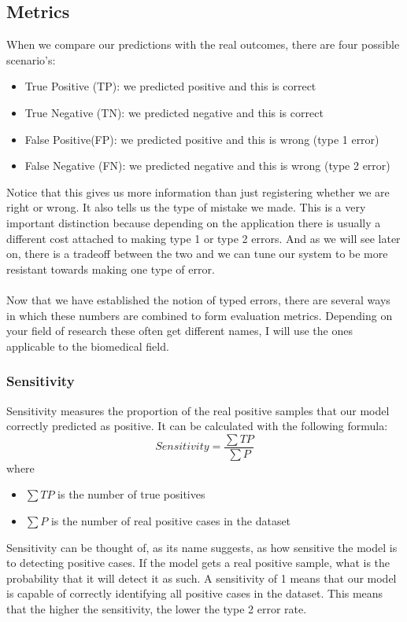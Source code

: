 \subsection{Metrics}
When we compare our predictions with the real outcomes, there are four possible scenario's:
\begin{itemize}
	\item True Positive (TP): we predicted positive and this is correct
	\item True Negative (TN): we predicted negative and this is correct
	\item False Positive(FP): we predicted positive and this is wrong (type 1 error)
	\item False Negative (FN): we predicted negative and this is wrong (type 2 error)
\end{itemize}
Notice that this gives us more information than just registering whether we are right or wrong. It also tells us the type of mistake we made. This is a very important distinction because depending on the application there is usually a different cost attached to making type 1 or type 2 errors. And as we will see later on, there is a tradeoff between the two and we can tune our system to be more resistant towards making one type of error. \\ \\
Now that we have established the notion of typed errors, there are several ways in which these numbers are combined to form evaluation metrics. Depending on your field of research these often get different names, I will use the ones applicable to the biomedical field.
\subsubsection{Sensitivity}
Sensitivity measures the proportion of the real positive samples that our model correctly predicted as positive. It can be calculated with the following formula:
$$
Sensitivity = \frac{\sum{TP}}{\sum{P}}
$$
where
\begin{itemize}
	\item $\sum{TP}$ is the number of true positives
	\item $\sum{P}$ is the number of real positive cases in the dataset
\end{itemize}
Sensitivity can be thought of, as its name suggests, as how sensitive the model is to detecting positive cases. If the model gets a real positive sample, what is the probability that it will detect it as such. A sensitivity of 1 means that our model is capable of correctly identifying all positive cases in the dataset. This means that the higher the sensitivity, the lower the type 2 error rate.
